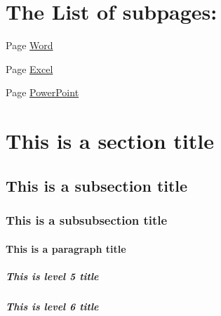 \section*{The List of subpages\+:}


\begin{DoxyItemize}
\item Page \hyperlink{subpage_1}{Word}
\item Page \hyperlink{subpage_2}{Excel}
\item Page \hyperlink{subpage_3}{Power\+Point}
\end{DoxyItemize}

\section*{This is a section title}

\subsection*{This is a subsection title}

\subsubsection*{This is a subsubsection title}

\paragraph*{This is a paragraph title}

\subparagraph*{This is level 5 title}

\subparagraph*{This is level 6 title}